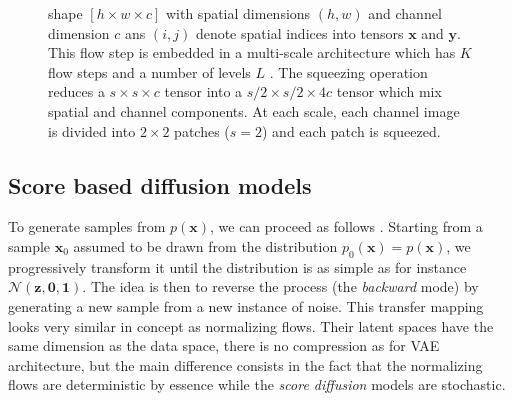\documentclass[11pt]{amsart}
\begin{document}
\begin{figure}
{shape $[h \times w \times c]$ with spatial dimensions $(h, w)$ and channel dimension $c$ ans $(i, j)$ denote
spatial indices into tensors $\bm{x}$ and $\bm{y}$.  This flow step is embedded in a multi-scale  architecture which has $K$ flow steps and a number of levels $L$ \citep{2016arXiv160508803D}. The squeezing operation reduces a $s \times s \times c$ tensor  into a $s/2\times s/2 \times 4c$ tensor which mix spatial and channel components. At each scale, each channel image is divided into $2\times 2$ patches ($s=2$) and each patch is squeezed. }
    \label{fig-Glow-archi}
\end{figure}
\subsection{Score based diffusion models}
%
To generate samples from $p(\bm{x})$, we can proceed as follows \citep[e.g][]{Chang2023,LinYang2023}. Starting from a sample $\bm{x}_0$ assumed to be drawn from the distribution $p_0(\bm{x})=p(\bm{x})$, we progressively transform it until the  distribution is as simple as for instance $\mathcal{N}(\bm{z},\bm{0},\bm{1})$.  The idea is then to reverse the process (the \textit{backward} mode) by generating a new sample from a new instance of noise. This transfer mapping looks very similar in concept as normalizing flows. Their latent spaces have the same dimension as the data space, there is no compression as for VAE architecture, but the main difference consists in the fact that the normalizing flows are deterministic by essence while the \textit{score diffusion} models are stochastic. 
\end{document}
